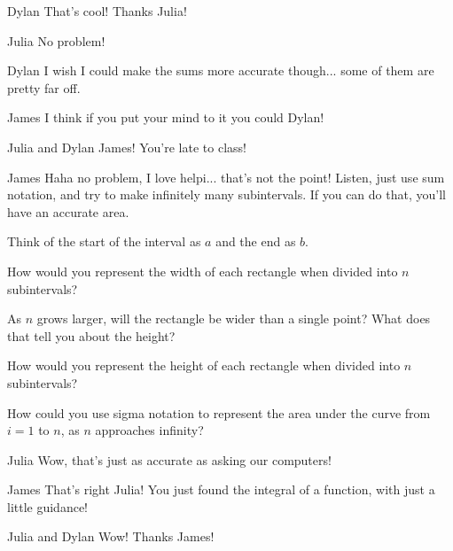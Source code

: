 \documentclass{ximera}
\begin{document}
\begin{dialogue}
\item[Dylan] That's cool! Thanks Julia!
\item[Julia] No problem!
\item[Dylan] I wish I could make the sums more accurate though... some of them are pretty far off.
\item[James] I think if you put your mind to it you could Dylan!
\item[Julia and Dylan] James! You're late to class!
\item[James] Haha no problem, I love helpi... that's not the point! Listen, just use sum notation, and try to make infinitely many subintervals. If you can do that, you'll have an accurate area.
\end{dialogue}
\begin{question}

\begin{hint}
Think of the start of the interval as $a$ and the end as $b$.
\end{hint}

How would you represent the width of each rectangle when divided into $n$ subintervals?

\begin{multipleChoice}
\end{multipleChoice}

\begin{hint}
As $n$ grows larger, will the rectangle be wider than a single point? What does that tell you about the height?
\end{hint}

How would you represent the height of each rectangle when divided into $n$ subintervals?

\begin{multipleChoice}
\end{multipleChoice}

How could you use sigma notation to represent the area under the curve from $i = 1$ to $n$, as $n$ approaches infinity?

\begin{multipleChoice}
\end{multipleChoice}

\end{question}
\begin{dialogue}
\item[Julia] Wow, that's just as accurate as asking our computers!
\item[James] That's right Julia! You just found the integral of a function, with just a little guidance!
\item[Julia and Dylan] Wow! Thanks James!
\end{dialogue}
\end{document}
